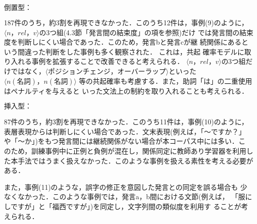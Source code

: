 \begin{description}

\item{\boldmath $倒置型：$} 

187件のうち，約3割を再現できなかった．このうち12件は，事例(9)のように，
$\langle n，rel，v \rangle$の3つ組(4.3節「発言間の結束度」の項を参照)だけ
では発言間の結束度を判断しにくい場合であった．このため，発言bと発言cが継
続関係にあるという間違った判断をした事例も多く観察された． これは，共起
確率モデルに取り入れる事例を拡張することで改善できると考えられる． 
$\langle n，rel，v \rangle$の3つ組だけではなく，$\langle ポジションチェン
ジ，オーバーラップ \rangle$といった $\langle n (名詞)，n (名詞) \rangle$
等の共起確率も考慮する．また，助詞「は」の二重使用はペナルティを与えると
いった文法上の制約を取り入れることも考えられる．


\item{\boldmath $挿入型：$} 

87件のうち，約3割を再現できなかった．このうち11件は，事例(10)のように，
表層表現からは判断しにくい場合であった．文末表現(例えば，「〜ですか？」
や「〜か」)をもつ発言間には継続関係がない場合が本コーパス中には多い．こ
のため，訓練事例中に正例と負例が混在し，関係同定に教師あり学習器を利用し
た本手法ではうまく扱えなかった．このような事例を扱える素性を考える必要が
ある．

  
  また，事例(11)のような，誤字の修正を意図した発言との同定を誤る場合も
  少なくなかった．このような事例では，発言a，b間における文節(例えば，
  「服にしですが」と「福西ですが」)を同定し，文字列間の類似度を利用す
  ることが考えられる．
  
\end{description}

